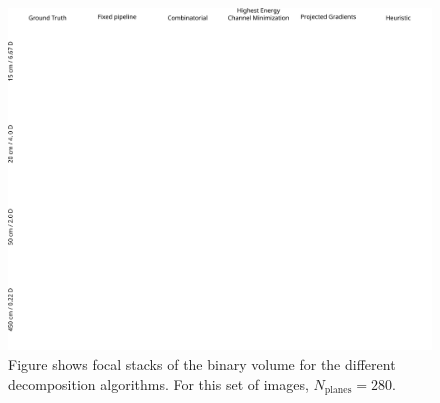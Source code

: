 \begin{figure}[!htb]
\centering
\includegraphics[width=0.99\columnwidth]{images/volumetric/acd_exp1/exp_FS}
\caption[Volumetric NED: Adaptive decomposition results: Focal stacks for opaque objects and $N_{\text{planes}}=280$]{Figure shows focal stacks of the binary volume for the different decomposition algorithms. For this set of images, $N_{\text{planes}}=280$.}
\label{fig:volumetric:acd:exp1:focalstack}
\end{figure}

